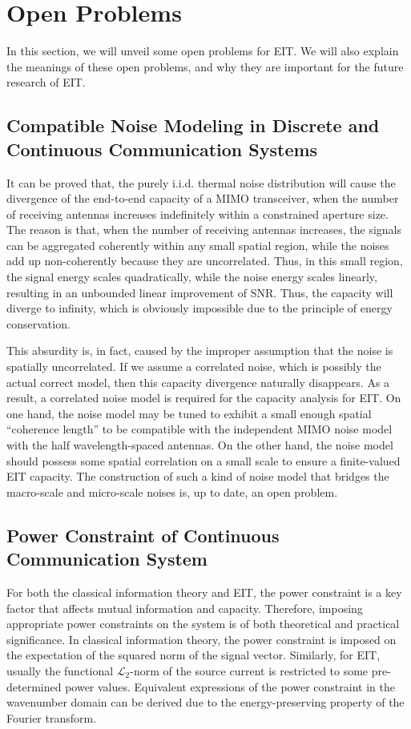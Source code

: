 \documentclass[journal,twocolumn]{IEEEtran}
\begin{document}
\section{Open Problems}
In this section, we will unveil some open problems for EIT. We will also explain the meanings of these open problems, and why they are important for the future research of EIT. 

\subsection{Compatible Noise Modeling in Discrete and Continuous Communication Systems}
It can be proved that, the purely i.i.d. thermal noise distribution will cause the divergence of the end-to-end capacity of a MIMO transceiver, when the number of receiving antennas increases indefinitely within a constrained aperture size. 
The reason is that, when the number of receiving antennas increases, the signals can be aggregated coherently within any small spatial region, while the noises add up non-coherently because they are uncorrelated. 
Thus, in this small region, the signal energy scales quadratically, while the noise energy scales linearly, resulting in an unbounded linear improvement of SNR. Thus, the capacity will diverge to infinity, which is obviously impossible due to the principle of energy conservation.  

This absurdity is, in fact, caused by the improper assumption that the noise is spatially uncorrelated. 
If we assume a correlated noise, which is possibly the actual correct model, then this capacity divergence naturally disappears. 
As a result, a correlated noise model is required for the capacity analysis for EIT. On one hand, the noise model may be tuned to exhibit a small enough spatial ``coherence length'' to be compatible with the independent MIMO noise model with the half wavelength-spaced antennas. On the other hand, the noise model should possess some spatial correlation on a small scale to ensure a finite-valued EIT capacity. 
The construction of such a kind of noise model that bridges the macro-scale and micro-scale noises is, up to date, an open problem. 

\subsection{Power Constraint of Continuous Communication System}
For both the classical information theory and EIT, the power constraint is a key factor that affects mutual information and capacity. 
Therefore, imposing appropriate power constraints on the system is of both theoretical and practical significance. 
In classical information theory, the power constraint is imposed on the expectation of the squared norm of the signal vector.  
Similarly, for EIT, usually the functional $\mathcal{L}_2$-norm of the source current is restricted to some pre-determined power values. 
Equivalent expressions of the power constraint in the wavenumber domain can be derived due to the energy-preserving property of the Fourier transform. 
\end{document}
